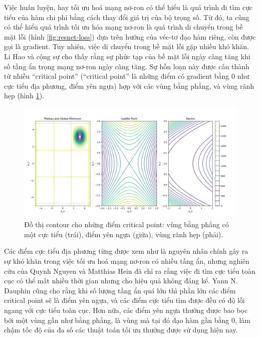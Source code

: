 Việc huấn luyện, hay tối ưu hoá mạng nơ-ron có thể hiểu là quá trình đi tìm cực tiểu của hàm chi phí bằng cách thay đổi giá trị của bộ trọng số. Từ đó, ta cũng có thể hiểu quá trình tối ưu hóa mạng nơ-ron là quá trình di chuyển trong bề mặt lỗi (hình \ref{fig:resnet-loss}) dựa trên hướng của véc-tơ đạo hàm riêng, còn được gọi là gradient. Tuy nhiên, việc di chuyển trong bề mặt lỗi gặp nhiều khó khăn. Li Hao và cộng sự \cite{li2018visualizing} cho thấy rằng sự phức tạp của bề mặt lỗi ngày càng tăng khi số tầng ẩn trọng mạng nơ-ron ngày càng tăng. Sự hỗn loạn này được cấu thành từ nhiều ``critical point'' (``critical point'' là những điểm có gradient bằng 0 như cực tiểu địa phương, điểm yên ngựa) hợp với các vùng bằng phẳng, và vùng rãnh hẹp (hình \ref{fig:cricial-point-contour}).

\begin{figure}[htp]
	\centering
	\includegraphics[width=120 mm]{images/cricial-point-contour.png}
	\caption{Đồ thị contour cho những điểm critical point: vùng bằng phẳng có một cực tiểu (trái), điểm yên ngựa (giữa), vùng rãnh hẹp (phải).}
	\label{fig:cricial-point-contour}
\end{figure}

Các điểm cực tiểu địa phương từng được xem như là nguyên nhân chính gây ra sự khó khăn trong việc tối ưu hoá mạng nơ-ron có nhiều tầng ẩn, nhưng nghiên cứu của Quynh Nguyen và Matthias Hein \cite{nguyen2017thelosssurface} đã chỉ ra rằng việc đi tìm cực tiểu toàn cục có thể mất nhiều thời gian nhưng cho hiệu quả không đáng kể. Yann N. Dauphin cũng cho rằng khi số lượng tầng ẩn quá lớn thì phần lớn các điểm critical point sẽ là điểm yên ngựa, và các điểm cực tiểu tìm được đều có độ lỗi ngang với cực tiểu toàn cục. Hơn nữa, các điểm yên ngựa thường được bao bọc bởi một vùng gần như bằng phẳng, là vùng mà tại đó đạo hàm gần bằng 0, làm chậm tốc độ của đa số các thuật toán tối ưu thường được sử dụng hiện nay.


